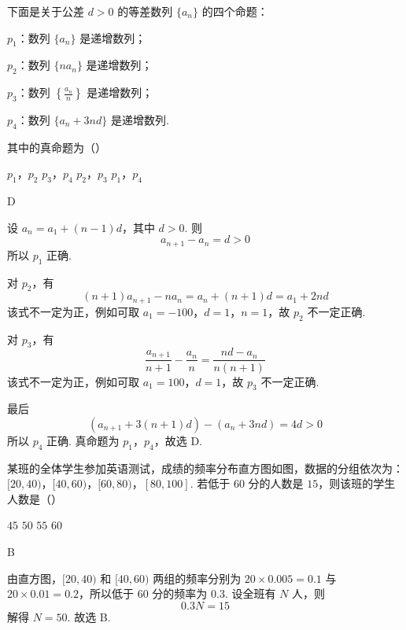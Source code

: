 \begin{problem}
下面是关于公差 \(d > 0\) 的等差数列 \(\{a_{n}\}\) 的四个命题：

\begin{circlelist}
\item \(p_{1}\)：数列 \(\{a_{n}\}\) 是递增数列；
\item \(p_{2}\)：数列 \(\{na_{n}\}\) 是递增数列；
\item \(p_{3}\)：数列 \(\left\{\frac{a_{n}}{n}\right\}\) 是递增数列；
\item \(p_{4}\)：数列 \(\{a_{n}+3nd\}\) 是递增数列.
\end{circlelist}

其中的真命题为（\quad）

\choices
    {\(p_1\)，\(p_2\)}
    {\(p_3\)，\(p_4\)}
    {\(p_2\)，\(p_3\)}
    {\(p_1\)，\(p_4\)}
\end{problem}

\begin{answer}
D
\end{answer}

\begin{solution}
设 \(a_n=a_1+(n-1)d\)，其中 \(d>0\). 则
\[
a_{n+1}-a_n=d>0
\]
所以 \(p_1\) 正确.

对 \(p_2\)，有
\[
(n+1)a_{n+1}-na_n=a_n+(n+1)d=a_1+2nd
\]
该式不一定为正，例如可取 \(a_1=-100\)，\(d=1\)，\(n=1\)，故 \(p_2\) 不一定正确.

对 \(p_3\)，有
\[
\frac{a_{n+1}}{n+1}-\frac{a_n}{n}
 =\frac{nd-a_n}{n(n+1)}
\]
该式不一定为正，例如可取 \(a_1=100\)，\(d=1\)，故 \(p_3\) 不一定正确.

最后
\[
(a_{n+1}+3(n+1)d)-(a_n+3nd)=4d>0
\]
所以 \(p_4\) 正确. 真命题为 \(p_1\)，\(p_4\)，故选 D.
\end{solution}

\begin{problem}
某班的全体学生参加英语测试，成绩的频率分布直方图如图，数据的分组依次为：\([20,40)\)，\([40,60)\)，\([60,80)\)，\([80,100]\). 若低于 \(60\) 分的人数是 \(15\)，则该班的学生人数是（\quad）


\choices
    {\(45\)}
    {\(50\)}
    {\(55\)}
    {\(60\)}
\end{problem}

\begin{answer}
B
\end{answer}

\begin{solution}
由直方图，\([20,40)\) 和 \([40,60)\) 两组的频率分别为
\(20\times0.005=0.1\) 与 \(20\times0.01=0.2\)，所以低于 \(60\) 分的频率为 \(0.3\). 设全班有 \(N\) 人，则
\[
0.3N=15
\]
解得 \(N=50\). 故选 B.
\end{solution}

